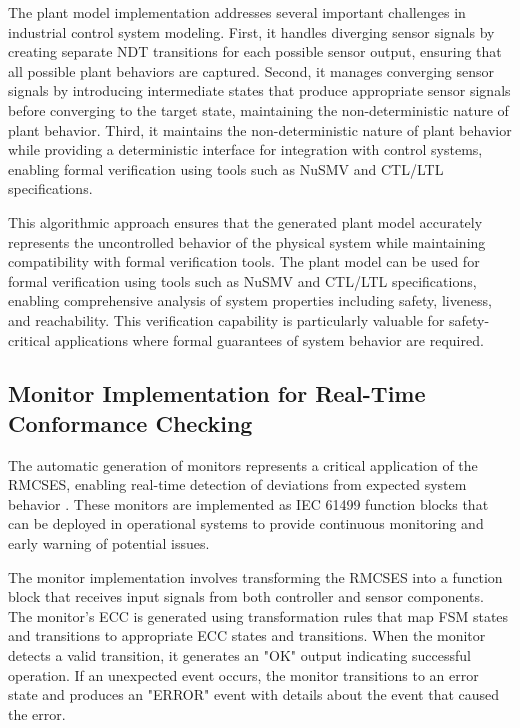 The plant model implementation addresses several important challenges in industrial control system modeling. First, it handles diverging sensor signals by creating separate NDT transitions for each possible sensor output, ensuring that all possible plant behaviors are captured. Second, it manages converging sensor signals by introducing intermediate states that produce appropriate sensor signals before converging to the target state, maintaining the non-deterministic nature of plant behavior. Third, it maintains the non-deterministic nature of plant behavior while providing a deterministic interface for integration with control systems, enabling formal verification using tools such as NuSMV and CTL/LTL specifications.

This algorithmic approach ensures that the generated plant model accurately represents the uncontrolled behavior of the physical system while maintaining compatibility with formal verification tools. The plant model can be used for formal verification using tools such as NuSMV and CTL/LTL specifications, enabling comprehensive analysis of system properties including safety, liveness, and reachability. This verification capability is particularly valuable for safety-critical applications where formal guarantees of system behavior are required.

\subsection{Monitor Implementation for Real-Time Conformance Checking}

The automatic generation of monitors represents a critical application of the RMCSES, enabling real-time detection of deviations from expected system behavior \cite{wenger2015behavioral}. These monitors are implemented as IEC 61499 function blocks that can be deployed in operational systems to provide continuous monitoring and early warning of potential issues.

The monitor implementation involves transforming the RMCSES into a function block that receives input signals from both controller and sensor components. The monitor's ECC is generated using transformation rules that map FSM states and transitions to appropriate ECC states and transitions. When the monitor detects a valid transition, it generates an "OK" output indicating successful operation. If an unexpected event occurs, the monitor transitions to an error state and produces an "ERROR" event with details about the event that caused the error.

